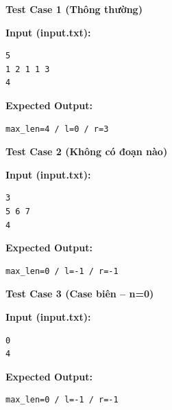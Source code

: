 \textbf{Test Case 1 (Thông thường)}

\textbf{Input (input.txt):}
\begin{lstlisting}
5
1 2 1 1 3
4
\end{lstlisting}

\textbf{Expected Output:}
\begin{lstlisting}
max_len=4 / l=0 / r=3
\end{lstlisting}

\vspace{0.5cm}

\textbf{Test Case 2 (Không có đoạn nào)}

\textbf{Input (input.txt):}
\begin{lstlisting}
3
5 6 7
4
\end{lstlisting}

\textbf{Expected Output:}
\begin{lstlisting}
max_len=0 / l=-1 / r=-1
\end{lstlisting}

\vspace{0.5cm}

\textbf{Test Case 3 (Case biên -- n=0)}

\textbf{Input (input.txt):}
\begin{lstlisting}
0
4
\end{lstlisting}

\textbf{Expected Output:}
\begin{lstlisting}
max_len=0 / l=-1 / r=-1
\end{lstlisting}